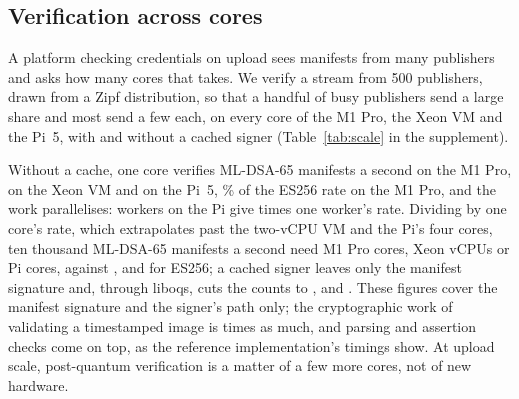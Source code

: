 \subsection{Verification across cores}
\label{sec:scale}

A platform checking credentials on upload sees manifests from many publishers
and asks how many cores that takes. We verify a stream from 500 publishers,
drawn from a Zipf distribution, so that a handful of busy publishers send a large share and most send a few each, on every core of the M1 Pro,
the Xeon VM and the Pi~5, with and without a cached signer
(Table~\ref{tab:scale} in the supplement).




Without a cache, one core verifies \NscMUncDSAsixtyfive{} ML-DSA-65
manifests a second on the M1 Pro, \NscXUncDSAsixtyfive{} on the Xeon VM and
\NscPUncDSAsixtyfive{} on the Pi~5, \NscMVsES\% of the ES256 rate on the M1
Pro, and the work parallelises: \NscPMax{} workers on the Pi give
\NscPSpeedUncDSAsixtyfive{} times one worker's rate. Dividing by one core's
rate, which extrapolates past the two-vCPU VM and the Pi's four cores, ten
thousand ML-DSA-65 manifests a second need \NscMCoresUncDSAsixtyfive{} M1 Pro cores,
\NscXCoresUncDSAsixtyfive{} Xeon vCPUs or \NscPCoresUncDSAsixtyfive{} Pi cores,
against \NscMCoresUncES{}, \NscXCoresUncES{} and \NscPCoresUncES{} for ES256;
a cached signer leaves only the manifest signature and, through liboqs, cuts
the counts to \NscMCoresOqsDSAsixtyfive, \NscXCoresOqsDSAsixtyfive{} and
\NscPCoresOqsDSAsixtyfive. These figures cover the manifest signature and the
signer's path only; the cryptographic work of validating a timestamped image
is \NvCompleteFactorDSAsixtyfive{} times as much, and parsing and assertion
checks come on top, as the reference implementation's timings show. At upload
scale, post-quantum verification is a matter of a few more cores, not of new
hardware.
